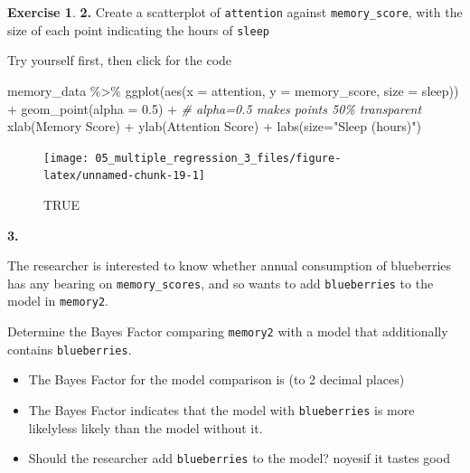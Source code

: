 \documentclass[
]{book}
\newenvironment{Shaded}{\begin{snugshade}}{\end{snugshade}}
\newcommand{\AttributeTok}[1]{\textcolor[rgb]{0.77,0.63,0.00}{#1}}
\newcommand{\CommentTok}[1]{\textcolor[rgb]{0.56,0.35,0.01}{\textit{#1}}}
\newcommand{\FloatTok}[1]{\textcolor[rgb]{0.00,0.00,0.81}{#1}}
\newcommand{\FunctionTok}[1]{\textcolor[rgb]{0.00,0.00,0.00}{#1}}
\newcommand{\NormalTok}[1]{#1}
\newcommand{\SpecialCharTok}[1]{\textcolor[rgb]{0.00,0.00,0.00}{#1}}
\newcommand{\StringTok}[1]{\textcolor[rgb]{0.31,0.60,0.02}{#1}}
\theoremstyle{definition}
\theoremstyle{definition}
\theoremstyle{definition}
\newtheorem{exercise}{Exercise}[chapter]
\theoremstyle{definition}
\theoremstyle{remark}
\begin{document}
\begin{exercise}
\hfill\break
\hfill\break

\textbf{2.}
Create a scatterplot of \texttt{attention} against \texttt{memory\_score}, with the size of each point indicating the hours of \texttt{sleep}

Try yourself first, then click for the code

\begin{Shaded}
\begin{Highlighting}[]
\NormalTok{memory\_data }\SpecialCharTok{\%\textgreater{}\%} 
  \FunctionTok{ggplot}\NormalTok{(}\FunctionTok{aes}\NormalTok{(}\AttributeTok{x =}\NormalTok{ attention, }\AttributeTok{y =}\NormalTok{ memory\_score, }\AttributeTok{size =}\NormalTok{ sleep)) }\SpecialCharTok{+}
  \FunctionTok{geom\_point}\NormalTok{(}\AttributeTok{alpha =} \FloatTok{0.5}\NormalTok{) }\SpecialCharTok{+}   \CommentTok{\# alpha=0.5 makes points 50\% transparent}
  \FunctionTok{xlab}\NormalTok{(}\StringTok{\textquotesingle{}Memory Score\textquotesingle{}}\NormalTok{) }\SpecialCharTok{+}
  \FunctionTok{ylab}\NormalTok{(}\StringTok{\textquotesingle{}Attention Score\textquotesingle{}}\NormalTok{) }\SpecialCharTok{+}
  \FunctionTok{labs}\NormalTok{(}\AttributeTok{size=}\StringTok{"Sleep (hours)"}\NormalTok{) }
\end{Highlighting}
\end{Shaded}

\begin{figure}

{\centering \texttt{[image: 05\_multiple\_regression\_3\_files/figure-latex/unnamed-chunk-19-1]} 

}

\caption{TRUE}\label{fig:unnamed-chunk-19}
\end{figure}

\hfill\break
\hfill\break
\textbf{3.}

The researcher is interested to know whether annual consumption of blueberries has any bearing on \texttt{memory\_scores}, and so wants to add \texttt{blueberries} to the model in \texttt{memory2}.

\hfill\break
Determine the Bayes Factor comparing \texttt{memory2} with a model that additionally contains \texttt{blueberries}.

\begin{itemize}
\item
  The Bayes Factor for the model comparison is (to 2 decimal places)
\item
  The Bayes Factor indicates that the model with \texttt{blueberries} is more likelyless likely than the model without it.
\item
  Should the researcher add \texttt{blueberries} to the model? noyesif it tastes good
\end{itemize}


\end{exercise}
\end{document}
